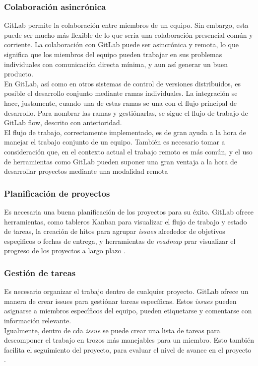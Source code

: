 \documentclass[runningheads]{llncs}
\begin{document}
\subsubsection{Colaboración asincrónica}
GitLab permite la colaboración entre miembros de un equipo. Sin embargo, esta puede ser mucho más flexible de lo que sería
una colaboración presencial común y corriente. La colaboración con GitLab puede ser asincrónica y remota, lo que significa
que los miembros del equipo pueden trabajar en sus problemas individuales con comunicación directa mínima, y aun así generar
un buen producto.\\
En GitLab, así como en otros sistemas de control de versiones distribuidos, es posible el desarrollo conjunto mediante ramas
individuales. La integración se hace, justamente, cuando una de estas ramas se una con el flujo principal de desarrollo. Para
nombrar las ramas y gestiónarlas, se sigue el flujo de trabajo de GitLab flow, descrito con anterioridad.\\
El flujo de trabajo, correctamente implementado, es de gran ayuda a la hora de manejar el trabajo conjunto de un equipo.
También es necesario tomar a consideración que, en el contexto actual el trabajo remoto es más común, y el uso de herramientas
como GitLab pueden suponer una gran ventaja a la hora de desarrollar proyectos mediante una modalidad remota \cite{choudhury2020gitlab}
\subsubsection{Planificación de proyectos}
Es necesaria una buena planificación de los proyectos para su éxito. GitLab ofrece herramientas, como tableros Kanban
para visualizar el flujo de trabajo y estado de tareas, la creación de hitos para agrupar \textit{issues} alrededor de
objetivos espeçificos o fechas de entrega, y herramientas de \textit{roadmap} prar visualizar el progreso de los proyectos
a largo plazo \cite{choudhury2020gitlab}.
\subsubsection{Gestión de tareas}
Es necesario organizar el trabajo dentro de cualquier proyecto. GitLab ofrece un manera de crear \textlatin{issues}
para gestiónar tareas específicas. Estos \textit{issues} pueden asignarse a miembros específicos del equipo, pueden
etiquetarse y comentarse con información relevante.\\
Igualmente, dentro de cda \textit{issue} se puede crear una lista de tareas para descomponer el trabajo en trozos más
manejables para un miembro. Esto también facilita el seguimiento del proyecto, para evaluar el nivel de avance en el
proyecto \cite{choudhury2020gitlab}.
\end{document}
